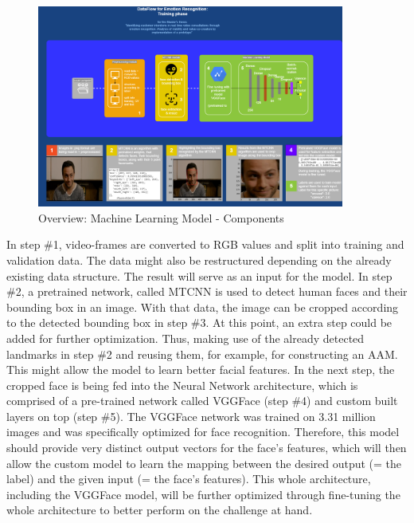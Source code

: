\documentclass[11pt,a4paper]{scrbook}
\begin{document}
\begin{figure}[H]
  \begin{center}
  \includegraphics[angle=90, width=0.9\textwidth]{Figures/DataFlow_Diagram_Expose.png}
  \caption{Overview: Machine Learning Model - Components}
  \label{fig:MachineLearningModelComponents}
  \end{center}
\end{figure}

In step \#1, video-frames are converted to RGB values and split into training and validation data. The data might also be restructured depending on the already existing data structure. The result will serve as an input for the model.
\newline\newline
In step \#2, a pretrained network, called \gls{MTCNN} is used to detect human faces and their bounding box in an image. With that data, the image can be cropped according to the detected bounding box in step \#3. At this point, an extra step could be added for further optimization. Thus, making use of the already detected landmarks in step \#2 and reusing them, for example, for constructing an \gls{AAM}. This might allow the model to learn better facial features.
\newline\newline
In the next step, the cropped face is being fed into the Neural Network architecture, which is comprised of a pre-trained network called VGGFace \cite{Cao:2018:VGGFace2} (step \#4) and custom built layers on top (step \#5). The VGGFace network was trained on 3.31 million images and was specifically optimized for face recognition. Therefore, this model should provide very distinct output vectors for the face's features, which will then allow the custom model to learn the mapping between the desired output (= the label) and the given input (= the face's features). This whole architecture, including the VGGFace model, will be further optimized through fine-tuning the whole architecture to better perform on the challenge at hand.
\end{document}
